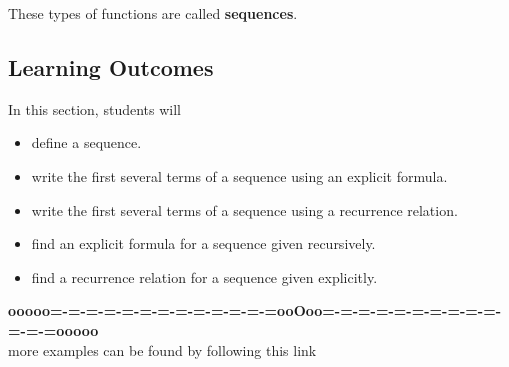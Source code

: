 \documentclass{ximera}
\begin{document}
These types of functions are called \textbf{\textcolor{purple!85!blue}{sequences}}. \\







\subsection{Learning Outcomes}


\begin{sectionOutcomes}

In this section, students will

\begin{itemize}
\item define a sequence.
\item write the first several terms of a sequence using an explicit formula.
\item write the first several terms of a sequence using a recurrence relation.
\item find an explicit formula for a sequence given recursively.
\item find a recurrence relation for a sequence given explicitly.
\end{itemize}

\end{sectionOutcomes}















\begin{center}
\textbf{\textcolor{green!50!black}{ooooo=-=-=-=-=-=-=-=-=-=-=-=-=ooOoo=-=-=-=-=-=-=-=-=-=-=-=-=ooooo}} \\

more examples can be found by following this link\\ 

\end{center}
\end{document}
